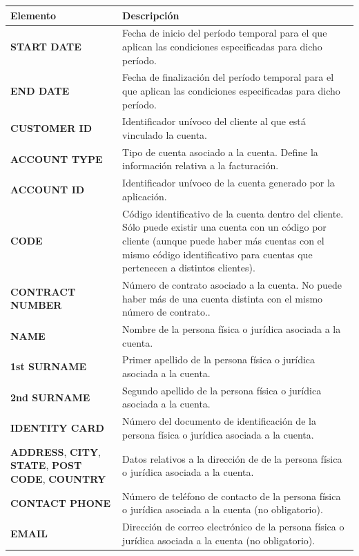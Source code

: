 \begin{table}
  \centering
  \setlength{\leftmargini}{0.4cm}
  \resizebox{14cm}{!} {
  \begin{tabular}{|m{5cm} m{9cm}|}
  \rowcolor{udcpink!25}
  \hline
  	\textbf{Elemento} & \textbf{Descripción} \\\hline
  	\textbf{START DATE} & Fecha de inicio del período temporal para el que aplican las condiciones especificadas para dicho período.\\
  	\textbf{END DATE} & Fecha de finalización del período temporal para el que aplican las condiciones especificadas para dicho período.\\
	\textbf{CUSTOMER ID} & Identificador unívoco del cliente al que está vinculado la cuenta.\\
	\textbf{ACCOUNT TYPE} & Tipo de cuenta asociado a la cuenta. Define la información relativa a la facturación.\\
	\textbf{ACCOUNT ID} & Identificador unívoco de la cuenta generado por la aplicación.\\
	\textbf{CODE} & Código identificativo de la cuenta dentro del cliente. Sólo puede existir una cuenta con un código por cliente (aunque puede haber más cuentas con el mismo código identificativo para cuentas que pertenecen a distintos clientes).\\
	\textbf{CONTRACT NUMBER} & Número de contrato asociado a la cuenta. No puede haber más de una cuenta distinta con el mismo número de contrato..\\
	\textbf{NAME} & Nombre de la persona física o jurídica asociada a la cuenta.\\
	\textbf{1st SURNAME} & Primer apellido de la persona física o jurídica asociada a la cuenta.\\
	\textbf{2nd SURNAME} & Segundo apellido de la persona física o jurídica asociada a la cuenta.\\
	\textbf{IDENTITY CARD} & Número del documento de identificación de la persona física o jurídica asociada a la cuenta.\\	
	\textbf{ADDRESS}, \textbf{CITY}, \textbf{STATE}, \textbf{POST CODE}, \textbf{COUNTRY}  & Datos relativos a la dirección de de la persona física o jurídica asociada a la cuenta.\\	
	\textbf{CONTACT PHONE} & Número de teléfono de contacto de la persona física o jurídica asociada a la cuenta (no obligatorio).\\
	\textbf{EMAIL} & Dirección de correo electrónico de la persona física o jurídica asociada a la cuenta (no obligatorio).\\

\end{tabular}}
\end{table}
